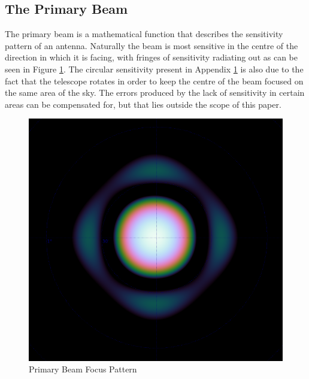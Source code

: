 \subsection{The Primary Beam}\label{tpb}
The primary beam is a mathematical function that describes the sensitivity pattern of an antenna. Naturally the beam is most sensitive in the centre of the direction in which it is facing, with fringes of sensitivity radiating out as can be seen in Figure \ref{beam}. The circular sensitivity present in Appendix \ref{beam} is also due to the fact that the telescope rotates in order to keep the centre of the beam focused on the same area of the sky. The errors produced by the lack of sensitivity in certain areas can be compensated for, but that lies outside the scope of this paper.
\begin{figure}[H]
	\centering
	\includegraphics[scale=0.28]{Images/beam.png}
	\caption{Primary Beam Focus Pattern}
	\label{beam}
\end{figure}
